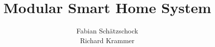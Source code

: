 \documentclass[12pt, twoside]{report}
\title{Modular Smart Home System}
\author{Fabian Schätzschock \\ Richard Krammer}
\begin{document}
    \maketitle \newpage
    \tableofcontents \newpage
    
    
    
    
    
    
    
    
    
    
    \cite{Wikipedia}
    
    
    
    \listoffigures
    
    
\end{document}
